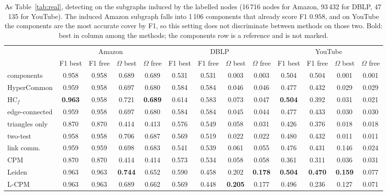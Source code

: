 \begin{table}[t]
\caption{As Table~\ref{tab:real}, detecting on the subgraphs induced by the labelled nodes (16\,716 nodes for Amazon, 93\,432 for DBLP, 47\,135 for YouTube). The induced Amazon subgraph falls into 1\,106 components that already score F1 $0.958$, and on YouTube the components are the most accurate cover by F1, so this setting does not discriminate between methods on those two. Bold: best in column among the methods; the components row is a reference and is not marked.}
\label{tab:realinduced}
\scriptsize\setlength{\tabcolsep}{2.5pt}
\begin{ruledtabular}
\begin{tabular}{lcccccccccccc}
 & \multicolumn{4}{c}{Amazon} & \multicolumn{4}{c}{DBLP} & \multicolumn{4}{c}{YouTube} \\
 & F1 best & F1 free & $\Omega$ best & $\Omega$ free & F1 best & F1 free & $\Omega$ best & $\Omega$ free & F1 best & F1 free & $\Omega$ best & $\Omega$ free \\
\hline
components & 0.958 & 0.958 & 0.689 & 0.689 & 0.531 & 0.531 & 0.003 & 0.003 & 0.504 & 0.504 & 0.001 & 0.001 \\
HyperCommon & 0.959 & 0.958 & 0.697 & 0.680 & 0.584 & 0.584 & 0.046 & 0.046 & 0.477 & 0.432 & 0.029 & 0.029 \\
HC$_f$ & \textbf{0.963} & 0.958 & 0.721 & \textbf{0.689} & 0.614 & 0.583 & 0.073 & 0.047 & \textbf{0.504} & 0.392 & 0.031 & 0.021 \\
edge-connected & 0.959 & 0.958 & 0.697 & 0.680 & 0.584 & 0.584 & 0.045 & 0.044 & 0.477 & 0.433 & 0.030 & 0.030 \\
triangles only & 0.870 & 0.870 & 0.414 & 0.413 & 0.576 & 0.549 & 0.058 & 0.031 & 0.426 & 0.376 & 0.018 & 0.018 \\
two-test & 0.958 & 0.958 & 0.706 & 0.687 & 0.569 & 0.519 & 0.022 & 0.022 & 0.480 & 0.432 & 0.011 & 0.011 \\
link comm. & 0.959 & 0.959 & 0.698 & 0.683 & 0.541 & 0.539 & 0.061 & 0.055 & 0.476 & 0.431 & 0.146 & 0.024 \\
CPM & 0.870 & 0.870 & 0.414 & 0.414 & 0.573 & 0.534 & 0.058 & 0.058 & 0.361 & 0.311 & 0.036 & 0.031 \\
Leiden & 0.963 & 0.963 & \textbf{0.744} & 0.652 & 0.590 & 0.458 & 0.202 & \textbf{0.178} & \textbf{0.504} & \textbf{0.470} & \textbf{0.159} & 0.077 \\
L-CPM & 0.963 & 0.963 & 0.689 & 0.662 & 0.569 & 0.448 & \textbf{0.205} & 0.177 & 0.496 & 0.236 & 0.127 & 0.071 \\

\end{tabular}
\end{ruledtabular}
\end{table}
